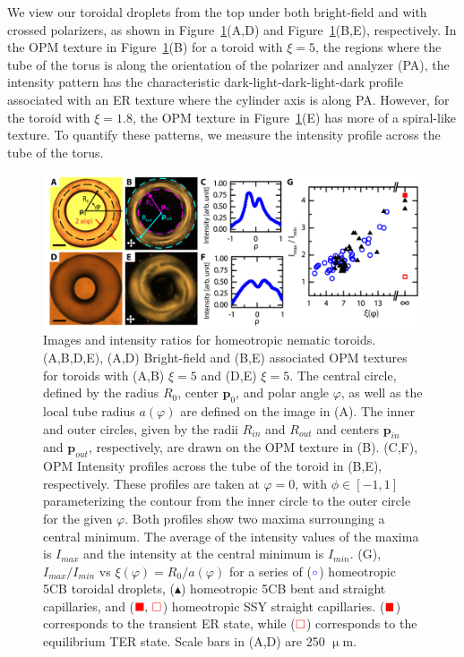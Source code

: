 We view our toroidal droplets from the top under both bright-field and with crossed polarizers, as shown in Figure~\ref{f:4-HomeoToroidsExp}(A,D) and Figure~\ref{f:4-HomeoToroidsExp}(B,E), respectively.
In the OPM texture in Figure~\ref{f:4-HomeoToroidsExp}(B) for a toroid with $\xi = 5$, the regions where the tube of the torus is along the orientation of the polarizer and analyzer (PA), the intensity pattern has the characteristic dark-light-dark-light-dark profile associated with an ER texture where the cylinder axis is along PA.
However, for the toroid with $\xi = 1.8$, the OPM texture in Figure~\ref{f:4-HomeoToroidsExp}(E) has more of a spiral-like texture.
To quantify these patterns, we measure the intensity profile across the tube of the torus.
\begin{figure}
  \centering
  \includegraphics{figures/C4/Ch4-Figs_HomeoToroidsExp.png}
  \caption{Images and intensity ratios for homeotropic nematic toroids.
  (A,B,D,E), (A,D) Bright-field and (B,E) associated OPM textures for toroids with (A,B) $\xi = 5$ and (D,E) $\xi = 5$.
  The central circle, defined by the radius $R_{0}$, center $\mathbf{p}_0$, and polar angle $\varphi$, as well as the local tube radius $a(\varphi)$ are defined on the image in (A).
  The inner and outer circles, given by the radii $R_{in}$ and $R_{out}$ and centers $\mathbf{p}_{in}$ and $\mathbf{p}_{out}$, respectively, are drawn on the OPM texture in (B).
  (C,F), OPM Intensity profiles across the tube of the toroid in (B,E), respectively.
  These profiles are taken at $\varphi = 0$, with $\phi \in [-1,1]$ parameterizing the contour from the inner circle to the outer circle for the given $\varphi$.
  Both profiles show two maxima surrounging a central minimum.
  The average of the intensity values of the maxima is $I_{max}$ and the intensity at the central minimum is $I_{min}$.
  (G), $I_{max}/I_{min}$ vs $\xi(\varphi) = R_0/a(\varphi)$ for a series of (${\color{blue} \circ}$) homeotropic 5CB toroidal droplets, (${\blacktriangle}$) homeotropic 5CB bent and straight capillaries, and (${\color{red} \blacksquare},\,{\color{red} \square}$) homeotropic SSY straight capillaries.
     (${\color{red} \blacksquare}$) corresponds to the transient ER state, while (${\color{red} \square}$) corresponds to the equilibrium TER state.
     Scale bars in (A,D) are 250 $\upmu$m.}\label{f:4-HomeoToroidsExp}
\end{figure}

